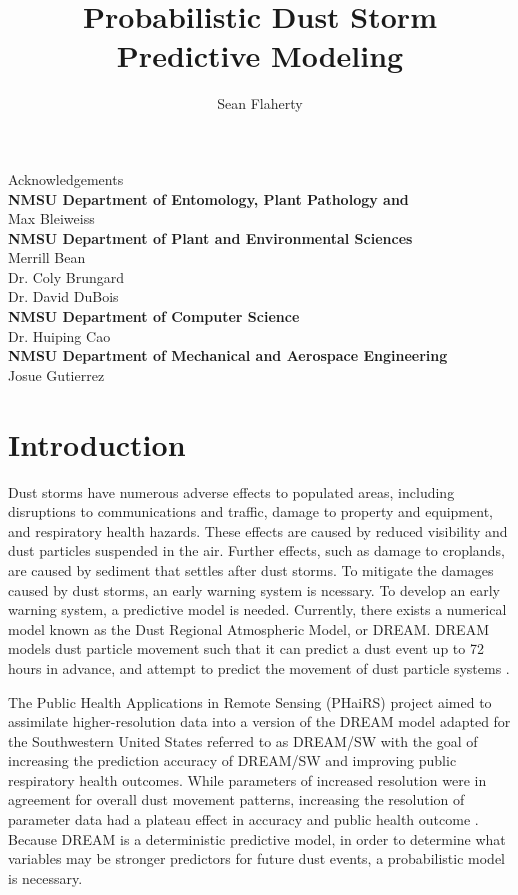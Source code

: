 \documentclass{article}
\author{Sean Flaherty}
\title{Probabilistic Dust Storm Predictive Modeling}
\begin{document}
\maketitle
\begin{center}
	{\LARGE Acknowledgements}\\
	\textbf{NMSU Department of Entomology, Plant Pathology and }\\
	Max Bleiweiss\\
	\textbf{NMSU Department of Plant and Environmental Sciences}\\
	Merrill Bean\\
	Dr. Coly Brungard\\
	Dr. David DuBois\\
	\textbf{NMSU Department of Computer Science}\\
	Dr. Huiping Cao\\
	\textbf{NMSU Department of Mechanical and Aerospace Engineering}\\
	Josue Gutierrez\\

\end{center}
\pagebreak
\tableofcontents
\pagebreak
\listoffigures
\pagebreak
\section{Introduction}
Dust storms have numerous adverse effects to populated areas, including disruptions to communications and traffic, damage to property and equipment, and respiratory health hazards. These effects are caused by reduced visibility and dust particles suspended in the air. Further effects, such as damage to croplands, are caused by sediment that settles after dust storms. To mitigate the damages caused by dust storms, an early warning system is ncessary. To develop an early warning system, a predictive model is needed. Currently, there exists a numerical model known as the Dust Regional Atmospheric Model, or DREAM. DREAM models dust particle movement such that it can predict a dust event up to 72 hours in advance, and attempt to predict the movement of dust particle systems \cite{unep}. 

The Public Health Applications in Remote Sensing (PHaiRS) project aimed to assimilate higher-resolution data into a version of the DREAM model adapted for the Southwestern United States referred to as DREAM/SW with the goal of increasing the prediction accuracy of DREAM/SW and improving public respiratory health outcomes. While parameters of increased resolution were in agreement for overall dust movement patterns, increasing the resolution of parameter data had a plateau effect in accuracy and public health outcome \cite{phairs}. Because DREAM is a deterministic predictive model, in order to determine what variables may be stronger predictors for future dust events, a probabilistic model is necessary.
\end{document}
